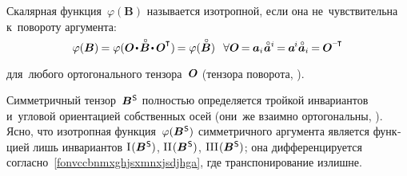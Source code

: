 \begin{otherlanguage}{russian}
Скалярная функция~${\varphi(\bm{B})}$ называется изотропной, если она не~чувствительна к~повороту аргумента:
\nopagebreak\vspace{.1em}\begin{equation*}
\varphi(\bm{B}) \hspace{-0.12ex} = \varphi ( \rotationtensor \narrowdotp \smash{\mathcircabove{\bm{B}}} \narrowdotp \hspace{.15ex} \rotationtensor^{\hspace{-0.06ex}\T} ) \hspace{-0.2ex} = \varphi(\smash{\mathcircabove{\bm{B}}}) \;\;\,
\forall \rotationtensor \hspace{-0.2ex}=\hspace{-0.1ex} \bm{a}_i \hspace{.1ex} \mathcircabove{\bm{a}}^i \hspace{-0.2ex} = \hspace{-0.1ex} \bm{a}^{\hspace{-0.16ex}i} \mathcircabove{\bm{a}}_i \hspace{-0.16ex} = \hspace{-0.1ex} \rotationtensor^{\hspace{-0.06ex}\expminusT}
\end{equation*}
\par\vspace{-0.25em}\noindent для~любого ортогонального тензора~$\bm{O}$ (тензора поворота, ).

Симметричный тензор~${\bm{B}^{\mathsf{\hspace{0.1ex}S}}}$ полностью определяется тройкой инвариантов и~угловой ориентацией собственных осей (они~же взаимно ортогональны, ). Ясно, что изотропная функция~${\varphi(\bm{B}^{\mathsf{\hspace{0.1ex}S}})}$ симметричного аргумента является функцией лишь инвариантов ${\mathrm{I}\hspace{0.16ex}({\bm{B}^{\mathsf{\hspace{0.1ex}S}}})}$, ${\mathrm{II}\hspace{0.16ex}({\bm{B}^{\mathsf{\hspace{0.1ex}S}}})}$, ${\mathrm{III}\hspace{0.16ex}({\bm{B}^{\mathsf{\hspace{0.1ex}S}}})}$; она дифференцируется согласно~\eqref{fonvccbnmxghjsxmnxjsdjhga}, где транспонирование излишне.

\end{otherlanguage}


